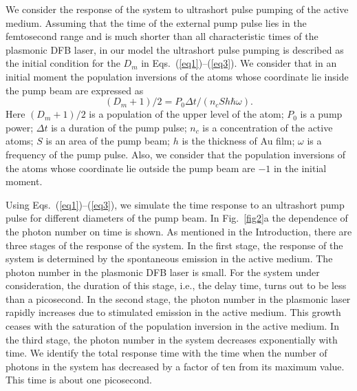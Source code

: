 \documentclass[aps,pra,amsmath,amssymb,onecolumn,superscriptaddress,showpacs,floatfix,]{revtex4-1}
\begin{document}
We consider the response of the system to ultrashort pulse pumping of the active medium.
Assuming that the time of the external pump pulse lies in the femtosecond range and is much shorter than all characteristic times of the plasmonic DFB laser, in our model the ultrashort pulse pumping is described as the initial condition for the $D_m$ in Eqs.~(\ref{eq1})--(\ref{eq3}). We consider that in an initial moment the population inversions of the atoms whose coordinate lie inside the pump beam are expressed as
\begin{equation}\label{eq5SM}
{\left(D_m+1\right)/2} = {P_0 \Delta t / \left(n_c S h \hbar \omega \right)}. 
\end{equation}
Here $\left(D_m+1\right)/2$ is a population of the upper level of the atom; $P_0$ is a pump power; $\Delta t$ is a duration of the pump pulse; $n_c$ is a concentration of the active atoms; $S$ is an area of the pump beam; $h$ is the thickness of Au film; $\omega$ is a frequency of the pump pulse. Also, we consider that the population inversions of the atoms whose coordinate lie outside the pump beam are $-1$ in the initial moment.

Using Eqs.~(\ref{eq1})--(\ref{eq3}), we simulate the time response to an ultrashort pump pulse for different diameters of the pump beam.
In Fig.~\ref{fig2}a the dependence of the photon number on time is shown.
As mentioned in the Introduction, there are three stages of the response of the system.
In the first stage, the response of the system is determined by the spontaneous emission in the active medium.
The photon number in the plasmonic DFB laser is small.
For the system under consideration, the duration of this stage, i.e., the delay time, turns out to be less than a picosecond.
In the second stage, the photon number in the plasmonic laser rapidly increases due to stimulated emission in the active medium.
This growth ceases with the saturation of the population inversion in the active medium.
In the third stage, the photon number in the system decreases exponentially with time.
We identify the total response time with the time when the number of photons in the system has decreased by a factor of ten from its maximum value.
This time is about one picosecond.
  
\end{document}
